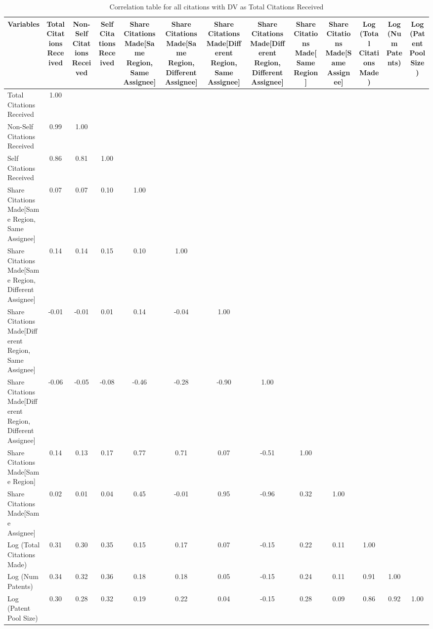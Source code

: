 \begin{table}[htbp]\centering \caption{Correlation table for all citations with DV as Total Citations Received\label{a.e.o.t.n.tcorrelation}}
\begin{tabular}{l  c  c  c  c  c  c  c  c  c  c  c  c }\hline\hline
\multicolumn{1}{c}{Variables} &Total Citations Received&Non-Self Citations Received&Self Citations Received&Share Citations Made[Same Region, Same Assignee]&Share Citations Made[Same Region, Different Assignee]&Share Citations Made[Different Region, Same Assignee]&Share Citations Made[Different Region, Different Assignee]&Share Citations Made[Same Region]&Share Citations Made[Same Assignee]&Log (Total Citations Made)&Log (Num Patents)&Log (Patent Pool Size)\\ \hline
Total Citations Received&1.00\\
Non-Self Citations Received&0.99&1.00\\
Self Citations Received&0.86&0.81&1.00\\
Share Citations Made[Same Region, Same Assignee]&0.07&0.07&0.10&1.00\\
Share Citations Made[Same Region, Different Assignee]&0.14&0.14&0.15&0.10&1.00\\
Share Citations Made[Different Region, Same Assignee]&-0.01&-0.01&0.01&0.14&-0.04&1.00\\
Share Citations Made[Different Region, Different Assignee]&-0.06&-0.05&-0.08&-0.46&-0.28&-0.90&1.00\\
Share Citations Made[Same Region]&0.14&0.13&0.17&0.77&0.71&0.07&-0.51&1.00\\
Share Citations Made[Same Assignee]&0.02&0.01&0.04&0.45&-0.01&0.95&-0.96&0.32&1.00\\
Log (Total Citations Made)&0.31&0.30&0.35&0.15&0.17&0.07&-0.15&0.22&0.11&1.00\\
Log (Num Patents)&0.34&0.32&0.36&0.18&0.18&0.05&-0.15&0.24&0.11&0.91&1.00\\
Log (Patent Pool Size)&0.30&0.28&0.32&0.19&0.22&0.04&-0.15&0.28&0.09&0.86&0.92&1.00\\
\hline \hline 
 \end{tabular}
\end{table}
